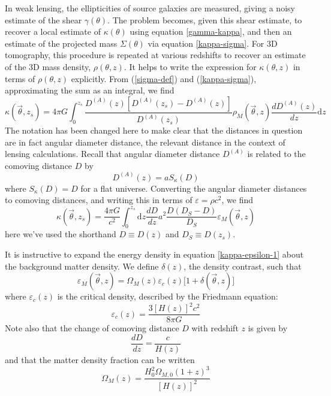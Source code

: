 \documentclass[12pt,preprint]{aastex}			%
\newcommand{\dd}{\mathrm{d}} %
\begin{document}
In weak lensing, the ellipticities of source galaxies are measured, 
giving a noisy estimate of the shear $\gamma(\theta)$.  The problem becomes, 
given this shear estimate, to recover a local estimate of 
$\kappa(\theta)$ using equation \ref{gamma-kappa}, and then an estimate 
of the projected mass $\Sigma(\theta)$ via equation \ref{kappa-sigma}.  
For 3D tomography, this procedure is repeated at various redshifts to recover 
an estimate of the 3D mass density, $\rho(\theta,z)$. It helps to write 
the expression for $\kappa(\theta,z)$ in terms of $\rho(\theta,z)$
 explicitly.  From (\ref{sigma-def}) and (\ref{kappa-sigma}), approximating 
the sum as an integral, we find
\begin{equation}
  \kappa(\vec{\theta},z_s) 
  = 4\pi G \int_0^{z_s} 
  \frac{D^{(A)}(z)[D^{(A)}(z_s)-D^{(A)}(z)]}{D^{(A)}(z_s)} 
  \rho_M(\vec{\theta},z) \frac{dD^{(A)}(z)}{dz} \dd z
\end{equation}
The notation has been changed here to make clear that the distances in 
question are in fact angular diameter distance, the relevant distance 
in the context of lensing calculations.  Recall that angular diameter 
distance $D^{(A)}$ is related to the comoving distance $D$ by
\begin{equation}
  D^{(A)}(z) = a S_\kappa (D)
\end{equation}
where $S_\kappa(D) = D$ for a flat universe.  Converting the angular 
diameter distances to comoving distances, and writing this in terms 
of $\varepsilon = \rho c^2$, we find
\begin{equation}
  \label{kappa-epsilon-1}
  \kappa(\vec{\theta},z_s) 
  = \frac{4\pi G}{c^2} \int_0^{z_s} \dd z\frac{dD}{dz} 
  a^2\frac{D(D_S-D)}{D_S} \varepsilon_M(\vec{\theta},z) 
\end{equation}
here we've used the shorthand $D \equiv D(z)$ and 
$D_S \equiv D(z_s)$.

It is instructive to expand the energy density in equation 
\ref{kappa-epsilon-1} about the background matter density.  
We define $\delta(z)$, the density contrast, such that
\begin{equation}
  \label{delta-def}
  \varepsilon_M(\vec{\theta},z) = \Omega_M(z) \varepsilon_c(z)\Big[1+\delta(\vec{\theta},z)\Big]
\end{equation}
where $\varepsilon_c(z)$ is the critical density, described by the Friedmann equation:
\begin{equation}
  \label{H-def}
  \varepsilon_c(z) = \frac{3 \left[H(z)\right]^2 c^2}{8\pi G}
\end{equation}
Note also that the change of comoving distance $D$ with redshift $z$ is given by
\begin{equation}
  \label{dDdz}
  \frac{dD}{dz} = \frac{c}{H(z)}
\end{equation}
and that the matter density fraction can be written
\begin{equation}
  \Omega_M(z) = \frac{H_0^2\Omega_{M,0}(1+z)^3}{[H(z)]^2}
\end{equation}
\end{document}
